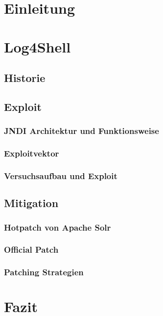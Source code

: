 

\section{Einleitung}
\section{Log4Shell}
\subsection{Historie}



\subsection{Exploit}
\subsubsection{JNDI Architektur und Funktionsweise}
\subsubsection{Exploitvektor}
\subsubsection{Versuchsaufbau und Exploit}
\subsection{Mitigation}

\subsubsection{Hotpatch von Apache Solr}
\subsubsection{Official Patch}
\subsubsection{Patching Strategien}
\section{Fazit}

%
